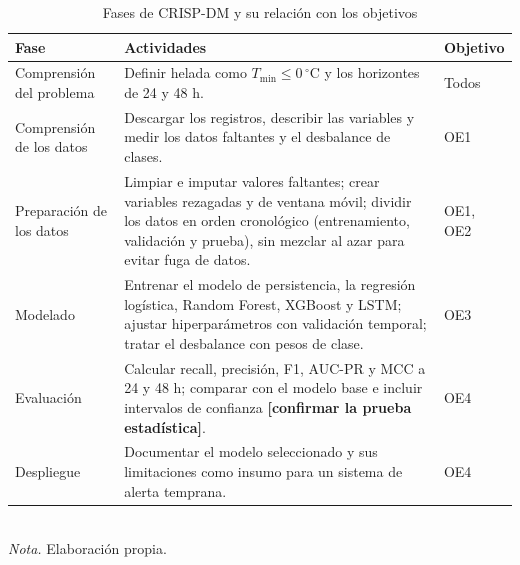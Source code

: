 \begin{table}[ht]
\centering
\caption{Fases de CRISP-DM y su relación con los objetivos}
\label{tab:crispdm}
\begin{tabular}{@{}p{3.6cm}p{9.2cm}p{2cm}@{}}
\toprule
\textbf{Fase} & \textbf{Actividades} & \textbf{Objetivo} \\
\midrule
Comprensión del problema & Definir helada como $T_{\min}\le 0\,^\circ$C y los horizontes de 24 y 48 h. & Todos \\
Comprensión de los datos & Descargar los registros, describir las variables y medir los datos faltantes y el desbalance de clases. & OE1 \\
Preparación de los datos & Limpiar e imputar valores faltantes; crear variables rezagadas y de ventana móvil; dividir los datos en orden cronológico (entrenamiento, validación y prueba), sin mezclar al azar para evitar fuga de datos. & OE1, OE2 \\
Modelado & Entrenar el modelo de persistencia, la regresión logística, Random Forest, XGBoost y LSTM; ajustar hiperparámetros con validación temporal; tratar el desbalance con pesos de clase. & OE3 \\
Evaluación & Calcular recall, precisión, F1, AUC-PR y MCC a 24 y 48 h; comparar con el modelo base e incluir intervalos de confianza \textbf{[confirmar la prueba estadística]}. & OE4 \\
Despliegue & Documentar el modelo seleccionado y sus limitaciones como insumo para un sistema de alerta temprana. & OE4 \\
\bottomrule
\end{tabular}\\
\textit{Nota.} Elaboración propia.
\end{table}